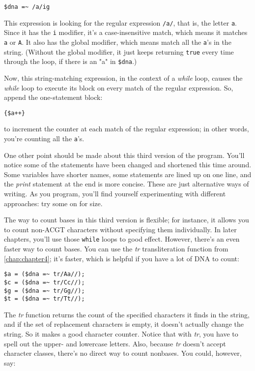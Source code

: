 \begin{lstlisting}
$dna =~ /a/ig 
\end{lstlisting}

This expression is looking for the regular expression \verb|/a/|, that is, the letter \verb|a|. Since it has the \verb|i| modifier, it's a case-insensitive match, which means it matches \verb|a| or \verb|A|. It also has the global modifier, which means match all the \verb|a|'s in the string. (Without the global modifier, it just keeps returning \verb|true| every time through the loop, if there is an "a" in \verb|$dna|.)

Now, this string-matching expression, in the context of a \textit{while} loop, causes the \textit{while} loop to execute its block on every match of the regular expression. So, append the one-statement block:

\begin{lstlisting}
{$a++}
\end{lstlisting}

to increment the counter at each match of the regular expression; in other words, you're counting all the \verb|a|'s. 

One other point should be made about this third version of the program. You'll notice some of the statements have been changed and shortened this time around. Some variables have shorter names, some statements are lined up on one line, and the \textit{print} statement at the end is more concise. These are just alternative ways of writing. As you program, you'll find yourself experimenting with different approaches: try some on for size.

The way to count bases in this third version is flexible; for instance, it allows you to count non-ACGT characters without specifying them individually. In later chapters, you'll use those \verb|while| loops to good effect. However, there's an even faster way to count bases. You can use the \textit{tr} transliteration function from \autoref{chap:chapter4}; it's faster, which is helpful if you have a lot of DNA to count: 

\begin{lstlisting}
$a = ($dna =~ tr/Aa//);
$c = ($dna =~ tr/Cc//);
$g = ($dna =~ tr/Gg//);
$t = ($dna =~ tr/Tt//);
\end{lstlisting}

The \textit{tr} function returns the count of the specified characters it finds in the string, and if the set of replacement characters is empty, it doesn't actually change the string. So it makes a good character counter. Notice that with \textit{tr}, you have to spell out the upper- and lowercase letters. Also, because \textit{tr} doesn't accept character classes, there's no direct way to count nonbases. You could, however, say: 


